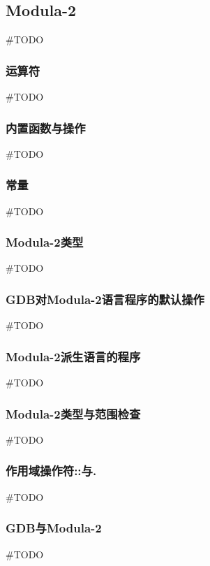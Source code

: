 \subsection{Modula-2}

\#TODO

\subsubsection{运算符}
\#TODO

\subsubsection{内置函数与操作}
\#TODO

\subsubsection{常量}
\#TODO

\subsubsection{Modula-2类型}
\#TODO

\subsubsection{GDB对Modula-2语言程序的默认操作}
\#TODO

\subsubsection{Modula-2派生语言的程序}
\#TODO

\subsubsection{Modula-2类型与范围检查}
\#TODO

\subsubsection{作用域操作符::与.}
\#TODO

\subsubsection{GDB与Modula-2}
\#TODO

